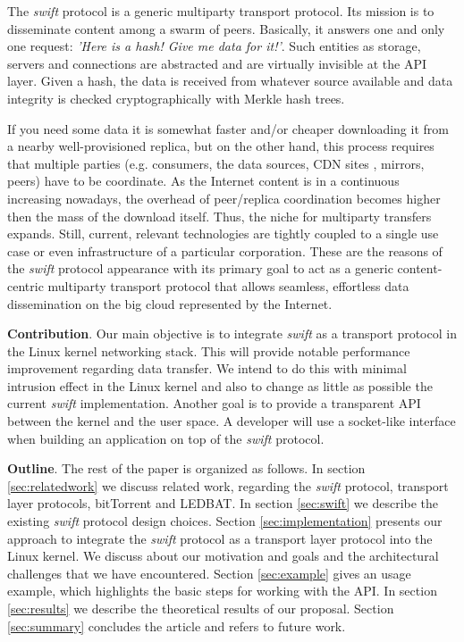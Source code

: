 
The \emph{swift} protocol is a generic multiparty transport protocol. Its mission is to disseminate content among a 
swarm of peers. Basically, it answers one and only one request: \emph{'Here is a hash! Give me data for it!'}. Such
entities as storage, servers and connections are abstracted and are virtually invisible at the API layer. Given a hash,
the data is received from whatever source available and data integrity is checked cryptographically with Merkle hash
trees.

If you need some data it is somewhat faster and/or cheaper downloading it from a nearby well-provisioned replica, but 
on the other hand, this process requires that multiple parties (e.g. consumers, the data sources, CDN
sites\cite{cdnwiki} , mirrors, peers) have to be coordinate. As the Internet content  is in a continuous increasing
nowadays, the overhead of peer/replica coordination becomes higher then the mass of the download itself. Thus, the niche
for multiparty transfers expands. Still, current, relevant technologies are tightly coupled to a single use case or even
infrastructure of a particular corporation. These are the reasons of the \emph{swift} protocol appearance with its
primary goal to act as a generic content-centric multiparty transport protocol that allows seamless, effortless data
dissemination on the big cloud represented by the Internet.

\textbf{Contribution}. Our main objective is to integrate \emph{swift} as a transport protocol in the Linux kernel
networking stack. This will provide notable performance improvement regarding data transfer. We intend to do this with
minimal intrusion effect in the Linux kernel and also to change as little as possible the current \emph{swift}
implementation. Another goal is to provide a transparent API between the kernel and the user space. A developer will use
a socket-like interface when building an application on top of the \emph{swift} protocol.

\textbf{Outline}. The rest of the paper is organized as follows. In section \ref{sec:relatedwork} we discuss related
work, regarding the \emph{swift} protocol, transport layer protocols, bitTorrent and LEDBAT. In section \ref{sec:swift}
we describe the existing \emph{swift} protocol design choices. Section \ref{sec:implementation} presents our approach to
integrate the \emph{swift} protocol as a transport layer protocol into the Linux kernel. We discuss about our motivation
and goals and the architectural challenges that we have encountered. Section \ref{sec:example} gives an usage example,
which highlights the basic steps for working with the API. In section \ref{sec:results} we describe the
theoretical results of our proposal. Section \ref{sec:summary} concludes the article and refers to future work.
